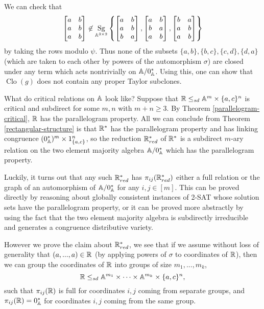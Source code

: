 \documentclass[letterpaper,11pt]{article}
\DeclareMathOperator{\Clo}{Clo}
\DeclareMathOperator{\Sg}{Sg}
\begin{document}
\begin{ex}
We can check that
\[
\begin{bmatrix} a & b\\ a & b\\ a & b\end{bmatrix} \not\in \Sg_{\bA^{3\times 2}}\left\{\begin{bmatrix} a & b\\ a & b\\ b & a\end{bmatrix}, \begin{bmatrix} a & b\\ b & a\\ a & b\end{bmatrix}, \begin{bmatrix} b & a\\ a & b\\ a & b\end{bmatrix}\right\}
\]
by taking the rows modulo $\psi$. Thus none of the subsets $\{a,b\}, \{b,c\}, \{c,d\}, \{d,a\}$ (which are taken to each other by powers of the automorphism $\sigma$) are closed under any term which acts nontrivially on $\mathbb{A}/0^*_{\mathbb{A}}$. Using this, one can show that $\Clo(g)$ does not contain any proper Taylor subclones.

What do critical relations on $\mathbb{A}$ look like? Suppose that $\mathbb{R} \le_{sd} \mathbb{A}^m\times \{a,c\}^n$ is critical and subdirect for some $m,n$ with $m+n \ge 3$. By Theorem \ref{parallelogram-critical}, $\mathbb{R}$ has the parallelogram property. All we can conclude from Theorem \ref{rectangular-structure} is that $\mathbb{R}^*$ has the parallelogram property and has linking congruence $(0^*_{\mathbb{A}})^m\times 1_{\{a,c\}}^n$, so the reduction $\mathbb{R}^*_{red}$ of $\mathbb{R}^*$ is a subdirect $m$-ary relation on the two element majority algebra $\mathbb{A}/0^*_{\mathbb{A}}$ which has the parallelogram property.

Luckily, it turns out that any such $\mathbb{R}^*_{red}$ has $\pi_{ij}(\mathbb{R}^*_{red})$ either a full relation or the graph of an automorphism of $\mathbb{A}/0^*_{\mathbb{A}}$ for any $i,j \in [m]$. This can be proved directly by reasoning about globally consistent instances of 2-SAT whose solution sets have the parallelogram property, or it can be proved more abstractly by using the fact that the two element majority algebra is subdirectly irreducible and generates a congruence distributive variety.

However we prove the claim about $\mathbb{R}^*_{red}$, we see that if we assume without loss of generality that $(a,...,a) \in \mathbb{R}$ (by applying powers of $\sigma$ to coordinates of $\mathbb{R}$), then we can group the coordinates of $\mathbb{R}$ into groups of size $m_1, ..., m_k$,
\[
\mathbb{R} \le_{sd} \mathbb{A}^{m_1} \times \cdots \times \mathbb{A}^{m_k} \times \{a,c\}^n,
\]
such that $\pi_{ij}(\mathbb{R})$ is full for coordinates $i,j$ coming from separate groups, and $\pi_{ij}(\mathbb{R}) = 0^*_{\mathbb{A}}$ for coordinates $i,j$ coming from the same group.


\end{ex}
\end{document}
